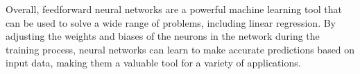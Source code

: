 \documentclass[a4paper, UKenglish, 11pt]{uiomaster}
\begin{document}
Overall, feedforward neural networks are a powerful machine learning tool that can be used to solve a wide range of problems, including linear regression. By adjusting the weights and biases of the neurons in the network during the training process, neural networks can learn to make accurate predictions based on input data, making them a valuable tool for a variety of applications.

%
%
%
%




​
\end{document}
